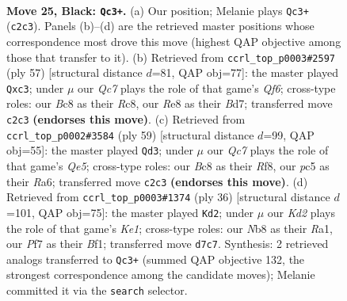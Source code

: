 \documentclass[11pt]{article}
\begin{document}
\clearpage

\begin{figure}[p]\centering
\begin{subfigure}{0.46\textwidth}\centering
\resizebox{\linewidth}{!}{%
\newchessgame
\chessboard[
  setfen={rnb1r3/1p1k1p1R/4p1n1/p1P1P1Q1/P4P2/8/2q1B3/R1B1K1N1 b Q - 0 25},
  showmover=false,
  pgfstyle=straightmove, color=movearrow, markmove={c2-c3}
]}
\caption{}
\end{subfigure}\hfill
\begin{subfigure}{0.46\textwidth}\centering
\resizebox{\linewidth}{!}{%
\newchessgame
\chessboard[
  setfen={2r3k1/1p1b1pp1/p1n4p/P1QP4/2N5/2P2qP1/7P/4RBK1 b - - 0 29},
  showmover=false,
  pgfstyle=straightmove, color=movearrow, markmove={f3-c3}
]}
\caption{}
\end{subfigure}
\\[4pt]
\begin{subfigure}{0.46\textwidth}\centering
\resizebox{\linewidth}{!}{%
\newchessgame
\chessboard[
  setfen={5rk1/1p3p1p/r2p1b2/1R2nPpB/3Bq3/1QP5/6PP/5R1K b - - 8 30},
  showmover=false,
  pgfstyle=straightmove, color=movearrow, markmove={e4-d3}
]}
\caption{}
\end{subfigure}\hfill
\begin{subfigure}{0.46\textwidth}\centering
\resizebox{\linewidth}{!}{%
\newchessgame
\chessboard[
  setfen={r3kb2/pp6/1qpp1Q2/4n1p1/4P1b1/PNN1P1R1/1PP5/R3KB1r w Qq - 1 19},
  showmover=false,
  pgfstyle=straightmove, color=movearrow, markmove={e1-d2}
]}
\caption{}
\end{subfigure}
\caption{\textbf{Move 25, Black: \texttt{Qc3+}.} (a) Our position; Melanie plays \texttt{Qc3+} (\texttt{c2c3}). Panels (b)--(d) are the retrieved master positions whose correspondence most drove this move (highest QAP objective among those that transfer to it). (b) Retrieved from \texttt{ccrl\_top\_p0003\#2597} (ply 57) [structural distance $d$=81, QAP obj=77]: the master played \texttt{Qxc3}; under $\mu$ our \emph{Qc7} plays the role of that game's \emph{Qf6}; cross-type roles: our \emph{B}c8 as their \emph{R}c8, our \emph{R}e8 as their \emph{B}d7; transferred move \texttt{c2c3} \textbf{(endorses this move)}. (c) Retrieved from \texttt{ccrl\_top\_p0002\#3584} (ply 59) [structural distance $d$=99, QAP obj=55]: the master played \texttt{Qd3}; under $\mu$ our \emph{Qc7} plays the role of that game's \emph{Qe5}; cross-type roles: our \emph{B}c8 as their \emph{R}f8, our \emph{p}c5 as their \emph{R}a6; transferred move \texttt{c2c3} \textbf{(endorses this move)}. (d) Retrieved from \texttt{ccrl\_top\_p0003\#1374} (ply 36) [structural distance $d$=101, QAP obj=75]: the master played \texttt{Kd2}; under $\mu$ our \emph{Kd2} plays the role of that game's \emph{Ke1}; cross-type roles: our \emph{N}b8 as their \emph{R}a1, our \emph{P}f7 as their \emph{B}f1; transferred move \texttt{d7c7}. Synthesis: 2 retrieved analogs transferred to \texttt{Qc3+} (summed QAP objective 132, the strongest correspondence among the candidate moves); Melanie committed it via the \texttt{search} selector.}
\label{fig:thought-m49}
\end{figure}
\end{document}
